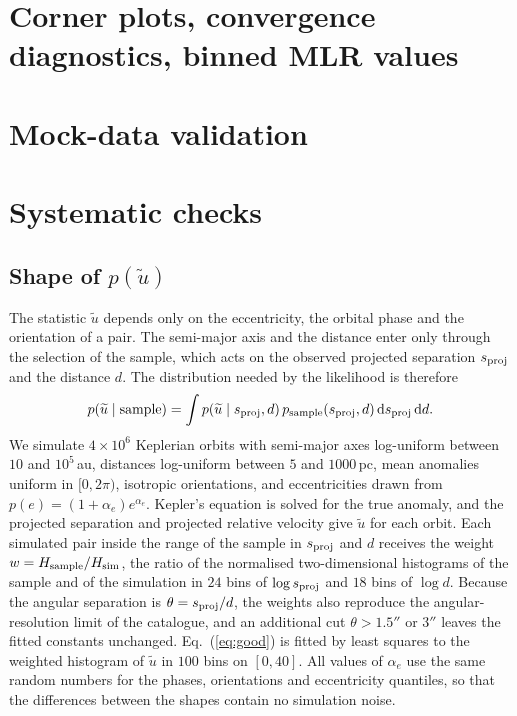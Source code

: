 \documentclass{aa}
\newcommand{\dd}{\,\mathrm{d}}
\begin{document}
\begin{appendix}
\section{Corner plots, convergence diagnostics, binned MLR values}


\section{Mock-data validation}\label{app:mock}


\section{Systematic checks}\label{sec:systematics}
\subsection{Shape of $p(\widetilde u)$}\label{sec:sys_pu}
The statistic $\widetilde u$ depends only on the eccentricity, the orbital phase and the orientation of a pair. The semi-major axis and the distance enter only through the selection of the sample, which acts on the observed projected separation $s_{\rm proj}$ and the distance $d$. The distribution needed by the likelihood is therefore
\begin{equation}
 p(\widetilde u\mid\text{sample})=\int p(\widetilde u\mid s_{\rm proj},d)\,p_{\rm sample}(s_{\rm proj},d)\dd s_{\rm proj}\dd d .
\end{equation}
We simulate $4\times10^6$ Keplerian orbits with semi-major axes log-uniform between $10$ and $10^5$\,au, distances log-uniform between $5$ and $1000$\,pc, mean anomalies uniform in $[0,2\pi)$, isotropic orientations, and eccentricities drawn from $p(e)=(1+\alpha_e)e^{\alpha_e}$. Kepler's equation is solved for the true anomaly, and the projected separation and projected relative velocity give $\widetilde u$ for each orbit. Each simulated pair inside the range of the sample in $s_{\rm proj}$ and $d$ receives the weight $w=H_{\rm sample}/H_{\rm sim}$, the ratio of the normalised two-dimensional histograms of the sample and of the simulation in $24$ bins of $\log s_{\rm proj}$ and $18$ bins of $\log d$. Because the angular separation is $\theta=s_{\rm proj}/d$, the weights also reproduce the angular-resolution limit of the catalogue, and an additional cut $\theta>1.5''$ or $3''$ leaves the fitted constants unchanged. Eq.~(\ref{eq:good}) is fitted by least squares to the weighted histogram of $\widetilde u$ in $100$ bins on $[0,40]$. All values of $\alpha_e$ use the same random numbers for the phases, orientations and eccentricity quantiles, so that the differences between the shapes contain no simulation noise.


\end{appendix}
\end{document}
